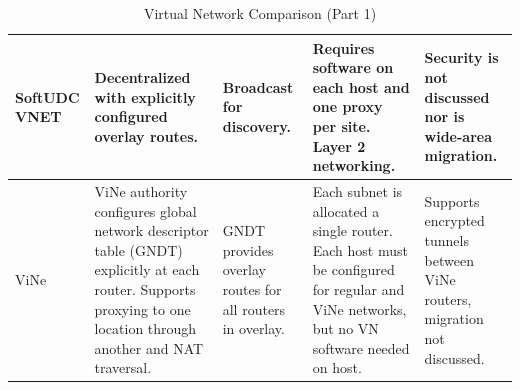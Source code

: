 \begin{table}[ht]
{\begin{tabular}{|p{.8in}||p{1.25in}|p{1.2in}|p{1.25in}|p{1.25in}|}
\\ \hline
SoftUDC VNET
&
Decentralized with explicitly configured overlay routes.
&
Broadcast for discovery.
&
Requires software on each host and one proxy per site.  Layer 2 networking.
&
Security is not discussed nor is wide-area migration.
\\ \hline
ViNe
&
ViNe authority configures global network descriptor table (GNDT) explicitly at
each router. Supports proxying to one location through another and NAT traversal.
&
GNDT provides overlay routes for all routers in overlay.
&
Each subnet is allocated a single router.  Each host must be configured for
regular and ViNe networks, but no VN software needed on host.
&
Supports encrypted tunnels between ViNe routers, migration not discussed.
\\ \hline
\end{tabular}
}
\caption{Virtual Network Comparison (Part 1)}
\label{tab:virtual_networks}
\end{table}

